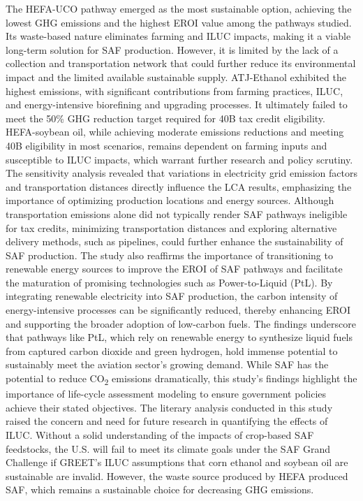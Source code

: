 \documentclass[12pt]{article}
\begin{document}
The HEFA-UCO pathway emerged as the most sustainable option, achieving the lowest GHG emissions and the highest EROI value among the pathways studied. Its waste-based nature eliminates farming and ILUC impacts, making it a viable long-term solution for SAF production. However, it is limited by the lack of a collection and transportation network that could further reduce its environmental impact and the limited available sustainable supply. ATJ-Ethanol exhibited the highest emissions, with significant contributions from farming practices, ILUC, and energy-intensive biorefining and upgrading processes. It ultimately failed to meet the 50\% GHG reduction target required for 40B tax credit eligibility. HEFA-soybean oil, while achieving moderate emissions reductions and meeting 40B eligibility in most scenarios, remains dependent on farming inputs and susceptible to ILUC impacts, which warrant further research and policy scrutiny.
The sensitivity analysis revealed that variations in electricity grid emission factors and transportation distances directly influence the LCA results, emphasizing the importance of optimizing production locations and energy sources. Although transportation emissions alone did not typically render SAF pathways ineligible for tax credits, minimizing transportation distances and exploring alternative delivery methods, such as pipelines, could further enhance the sustainability of SAF production.
The study also reaffirms the importance of transitioning to renewable energy sources to improve the EROI of SAF pathways and facilitate the maturation of promising technologies such as Power-to-Liquid (PtL). By integrating renewable electricity into SAF production, the carbon intensity of energy-intensive processes can be significantly reduced, thereby enhancing EROI and supporting the broader adoption of low-carbon fuels. The findings underscore that pathways like PtL, which rely on renewable energy to synthesize liquid fuels from captured carbon dioxide and green hydrogen, hold immense potential to sustainably meet the aviation sector's growing demand. 
While SAF has the potential to reduce CO\textsubscript{2} emissions dramatically, this study’s findings highlight the importance of life-cycle assessment modeling to ensure government policies achieve their stated objectives. The literary analysis conducted in this study raised the concern and need for future research in quantifying the effects of ILUC. Without a solid understanding of the impacts of crop-based SAF feedstocks, the U.S. will fail to meet its climate goals under the SAF Grand Challenge if GREET’s ILUC assumptions that corn ethanol and soybean oil are sustainable are invalid. However, the waste source produced by HEFA produced SAF, which remains a sustainable choice for decreasing GHG emissions. 
\end{document}
